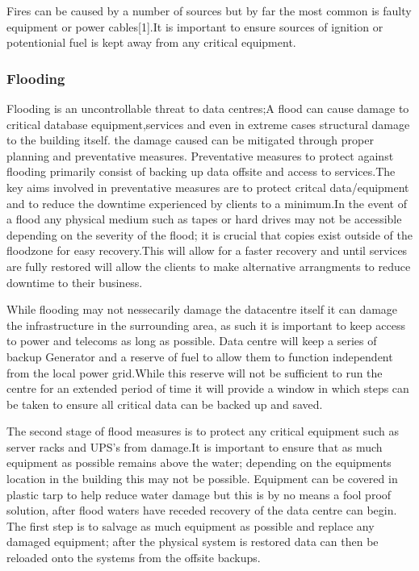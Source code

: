 \documentclass[11pt]{article}
\begin{document}
Fires can be caused by a number of sources but by far the most common is faulty equipment or power cables[1].It is important to ensure sources of ignition or potentionial fuel is kept away from any critical equipment. 

\subsubsection{Flooding}
Flooding is an uncontrollable threat to data centres;A flood can cause damage to critical database equipment,services and even in extreme cases structural damage to the building itself. the damage caused can be mitigated through  proper planning and preventative measures. Preventative measures to protect against flooding primarily consist of backing up data offsite and access to services.The key aims involved in preventative measures are to protect critcal data/equipment and to reduce the downtime experienced by clients to a minimum.In the event of a flood any physical medium such as tapes or hard drives may not be accessible depending on the severity of the flood; it is crucial that copies exist outside of the floodzone for easy recovery.This will allow for a faster recovery and until services are fully restored will allow the clients to make alternative arrangments to reduce downtime to their business.

While flooding may not nessecarily damage the datacentre itself it can damage the infrastructure in the surrounding area, as such it is important to keep access to power and telecoms as long as possible. Data centre will keep a series of backup Generator and a reserve of fuel to allow them to function independent from the local power grid.While this reserve will not be sufficient to run the centre for an extended period of time it will provide a window in which steps can be taken to ensure all critical data can be backed up and saved.

The second stage of flood measures is to protect any critical equipment such as server racks and UPS's from damage.It is important to ensure that as much equipment as possible remains above the water; depending on the equipments location in the building this may not be possible. Equipment can be covered in plastic tarp to help reduce water damage but this is by no means a fool proof solution, after flood waters have receded recovery of the data centre can begin. The first step is to salvage as much equipment as possible and replace any damaged equipment; after the physical system is restored data can then be reloaded onto the systems from the offsite backups.
\end{document}
